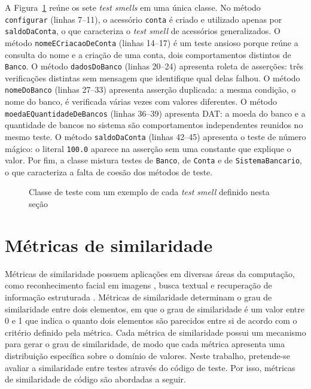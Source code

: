 A Figura~\ref{code:9-test-smells} reúne os sete \textit{test smells} em uma única classe. No método \texttt{configurar} (linhas 7--11), o acessório \texttt{conta} é criado e utilizado apenas por \texttt{saldoDaConta}, o que caracteriza o \textit{test smell} de acessórios generalizados. O método \texttt{nomeECriacaoDeConta} (linhas 14--17) é um teste ansioso porque reúne a consulta do nome e a criação de uma conta, dois comportamentos distintos de \texttt{Banco}. O método \texttt{dadosDoBanco} (linhas 20--24) apresenta roleta de asserções: três verificações distintas sem mensagem que identifique qual delas falhou. O método \texttt{nomeDoBanco} (linhas 27--33) apresenta asserção duplicada: a mesma condição, o nome do banco, é verificada várias vezes com valores diferentes. O método \texttt{moedaEQuantidadeDe\-Bancos} (linhas 36--39) apresenta DAT: a moeda do banco e a quantidade de bancos no sistema são comportamentos independentes reunidos no mesmo teste. O método \texttt{saldoDaConta} (linhas 42--45) apresenta o teste de número mágico: o literal \texttt{100.0} aparece na asserção sem uma constante que explique o valor. Por fim, a classe mistura testes de \texttt{Banco}, de \texttt{Conta} e de \texttt{SistemaBancario}, o que caracteriza a falta de coesão dos métodos de teste.

\begin{figure}[htb]
	\centering
	
	\caption{Classe de teste com um exemplo de cada \textit{test smell} definido nesta seção}
	\label{code:9-test-smells}
\end{figure}

\section{Métricas de similaridade}

Métricas de similaridade possuem aplicações em diversas áreas da computação, como reconhecimento facial em imagens \cite{cao:etal:2013}, busca textual \cite{sahami:etal:2006} e recuperação de informação estruturada \cite{dorneles:etal:2004}. Métricas de similaridade determinam o grau de similaridade entre dois elementos, em que o grau de similaridade é um valor entre 0 e 1 que indica o quanto dois elementos são parecidos entre si de acordo com o critério definido pela métrica. Cada métrica de similaridade possui um mecanismo para gerar o grau de similaridade, de modo que cada métrica apresenta uma distribuição específica sobre o domínio de valores. Neste trabalho, pretende-se avaliar a similaridade entre testes através do código de teste. Por isso, métricas de similaridade de código são abordadas a seguir.

